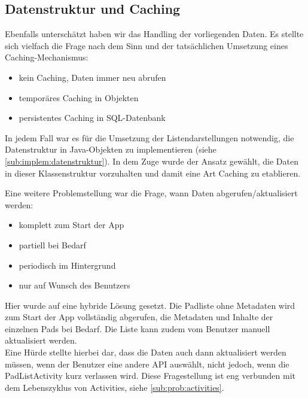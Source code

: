 \newpage
\subsection{Datenstruktur und Caching}
Ebenfalls unterschätzt haben wir das Handling der vorliegenden Daten.
Es stellte sich vielfach die Frage nach dem Sinn und der tatsächlichen Umsetzung eines Caching-Mechanismus:

\begin{itemize}
	\item kein Caching, Daten immer neu abrufen
	\item temporäres Caching in Objekten
	\item persistentes Caching in SQL-Datenbank
\end{itemize}

In jedem Fall war es für die Umsetzung der Listendarstellungen notwendig, die Datenstruktur in Java-Objekten zu implementieren (siehe \autoref{sub:implem:datenstruktur}).
In dem Zuge wurde der Ansatz gewählt, die Daten in dieser Klassenstruktur vorzuhalten und damit eine Art Caching zu etablieren.

Eine weitere Problemstellung war die Frage, wann Daten abgerufen/aktualisiert werden:

\begin{itemize}
	\item komplett zum Start der App
	\item partiell bei Bedarf
	\item periodisch im Hintergrund
	\item nur auf Wunsch des Benutzers
\end{itemize}

Hier wurde auf eine hybride Lösung gesetzt.
Die Padliste ohne Metadaten wird zum Start der App vollständig abgerufen, die Metadaten und Inhalte der einzelnen Pads bei Bedarf.
Die Liste kann zudem vom Benutzer manuell aktualisiert werden.\\
Eine Hürde stellte hierbei dar, dass die Daten auch dann aktualisiert werden müssen, wenn der Benutzer eine andere API auswählt, nicht jedoch, wenn die PadListActivity kurz verlassen wird.
Diese Fragestellung ist eng verbunden mit dem Lebenszyklus von Activities, siehe \autoref{sub:prob:activities}.

